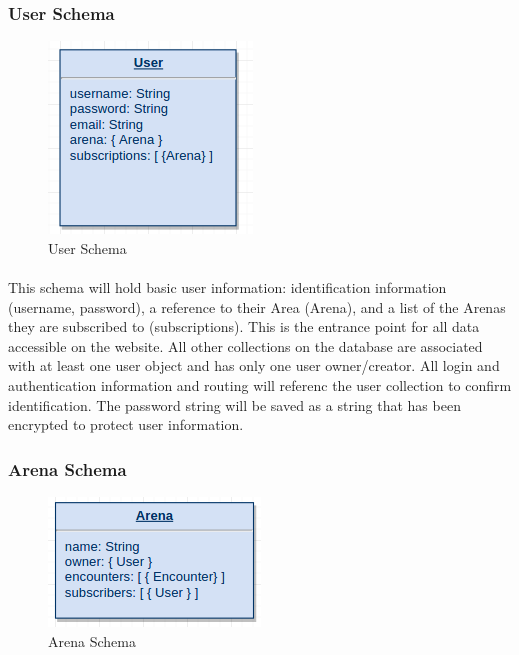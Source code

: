 \documentclass[12pt,a4paper]{report}
\begin{document}
\subsubsection{User Schema}
\begin{figure}[h]
	\centering
	\includegraphics[scale=.75]{schema-user}
	\caption{User Schema}
	\label{fig: User Schema }
\end{figure}

\paragraph{}This schema will hold basic user information: identification information (username, password), a reference to their Area (Arena), and a list of the Arenas they are subscribed to (subscriptions). This is the entrance point for all data accessible on the website. All other collections on the database are associated with at least one user object and has only one user owner/creator. All login and authentication information and routing will referenc the user collection to confirm identification. The password string will be saved as a string that has been encrypted to protect user information.
\subsubsection{Arena Schema}

\begin{figure}[h]
	\centering
	\includegraphics[scale=.75]{schema-arena}
	\caption{Arena Schema}
	\label{fig: Arena Schema }
\end{figure}
\end{document}
